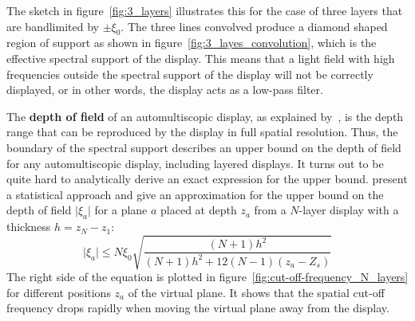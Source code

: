 The sketch in figure~\ref{fig:3_layers} illustrates this for the case of three layers that are bandlimited by $\pm \xi_0$.
The three lines convolved produce a diamond shaped region of support as shown in figure~\ref{fig:3_layes_convolution}, which is the effective spectral support of the display.
This means that a light field with high frequencies outside the spectral support of the display will not be correctly displayed, or in other words, the display acts as a low-pass filter.

The \textbf{depth of field} of an automultiscopic display, as explained by~\cite{Antialiasingfor3DDisplays}, is the depth range that can be reproduced by the display in full spatial resolution.
Thus, the boundary of the spectral support describes an upper bound on the depth of field for any automultiscopic display, including layered displays.
It turns out to be quite hard to analytically derive an exact expression for the upper bound.
\cite{WetzsteinTomo} present a statistical approach and give an approximation for the upper bound on the depth of field $\lvert \xi_a \rvert$ for a plane $a$ placed at depth $z_a$ from a \mbox{$N$-layer} display with a thickness $h = z_N - z_1$:
\begin{equation}
	\lvert \xi_a \rvert \leq N \xi_0 \sqrt{ \frac{(N + 1) h^2}{(N + 1) h^2 + 12(N - 1)(z_a - Z_s)} }
\end{equation}
The right side of the equation is plotted in figure~\ref{fig:cut-off-frequency_N_layers} for different positions $z_a$ of the virtual plane.
It shows that the spatial cut-off frequency drops rapidly when moving the virtual plane away from the display.

